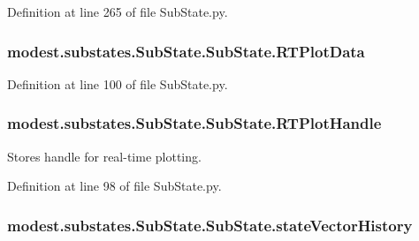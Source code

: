 Definition at line 265 of file Sub\+State.\+py.

\subsubsection[{\texorpdfstring{R\+T\+Plot\+Data}{RTPlotData}}]{\setlength{\rightskip}{0pt plus 5cm}modest.\+substates.\+Sub\+State.\+Sub\+State.\+R\+T\+Plot\+Data\hspace{0.3cm}{\ttfamily [inherited]}}\hypertarget{classmodest_1_1substates_1_1SubState_1_1SubState_a7f639244937fbae85f58ac478b0528c0}{}\label{classmodest_1_1substates_1_1SubState_1_1SubState_a7f639244937fbae85f58ac478b0528c0}


Definition at line 100 of file Sub\+State.\+py.

\subsubsection[{\texorpdfstring{R\+T\+Plot\+Handle}{RTPlotHandle}}]{\setlength{\rightskip}{0pt plus 5cm}modest.\+substates.\+Sub\+State.\+Sub\+State.\+R\+T\+Plot\+Handle\hspace{0.3cm}{\ttfamily [inherited]}}\hypertarget{classmodest_1_1substates_1_1SubState_1_1SubState_a28d5d778050affd247711bab8b126e80}{}\label{classmodest_1_1substates_1_1SubState_1_1SubState_a28d5d778050affd247711bab8b126e80}


Stores handle for real-\/time plotting. 



Definition at line 98 of file Sub\+State.\+py.

\subsubsection[{\texorpdfstring{state\+Vector\+History}{stateVectorHistory}}]{\setlength{\rightskip}{0pt plus 5cm}modest.\+substates.\+Sub\+State.\+Sub\+State.\+state\+Vector\+History\hspace{0.3cm}{\ttfamily [inherited]}}\hypertarget{classmodest_1_1substates_1_1SubState_1_1SubState_acb24540b23c1fb76233b6b4ff5bf47ce}{}\label{classmodest_1_1substates_1_1SubState_1_1SubState_acb24540b23c1fb76233b6b4ff5bf47ce}


